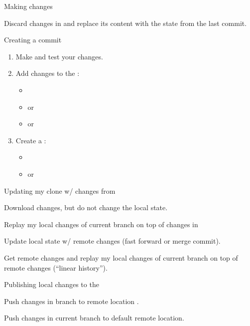 \begin{frame}{Making changes}
\begin{block}{}
Discard changes in  and replace its content with the state from the last commit.
\end{block}
\begin{block}{Creating a commit}
\begin{enumerate}
\item Make and test your changes.
\item Add changes to the :
\begin{itemize}
\item {}
\item {} or 
\item {} or 
\end{itemize}
\item Create a :
\begin{itemize}
\item {}
\item {} or 
\end{itemize}
\end{enumerate}
\end{block}
\end{frame}

\begin{frame}{Updating my clone w/ changes from }
\begin{block}{}
Download changes, but do not change the local state.
\end{block}
\begin{block}{}
Replay my local changes of current branch on top of changes in 
\end{block}
\begin{block}{}
Update local state w/ remote changes (fast forward or merge commit).
\end{block}
\begin{block}{}
Get remote changes and replay my local changes of current branch on top of remote changes (``linear history'').
\end{block}
\end{frame}

\begin{frame}{Publishing local changes to the }
\begin{block}{}
Push changes in branch  to remote location .
\end{block}
\begin{block}{}
Push changes in current branch to default remote location.
\end{block}
\end{frame}

